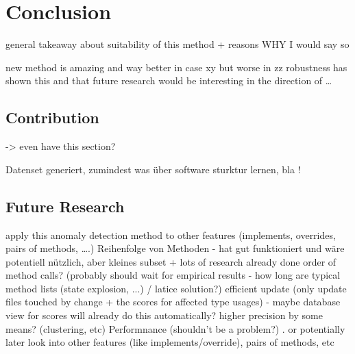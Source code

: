 \chapter{Conclusion}
general takeaway about suitability of this method + reasons WHY I would say so

new method is amazing and way better in case xy but worse in zz
robustness has shown this and that
future research would be interesting in the direction of \ldots

\section{Contribution}
-> even have this section?

Datenset generiert, zumindest was über software sturktur lernen, bla !

\section{Future Research}
apply this anomaly detection method to other features (implements, overrides, pairs of methods, \ldots.)
Reihenfolge von Methoden - hat gut funktioniert und wäre potentiell nützlich, aber kleines subset + lots of research already done
order of method calls? (probably should wait for empirical results - how long are typical method lists (state explosion, ...) / latice solution?)
efficient update (only update files touched by change + the scores for affected type usages) - maybe database view for scores will already do this automatically? 
higher precision by some means? (clustering, etc)
Performnance (shouldn't be a problem?)
.
or potentially later look into other features (like implements/override), pairs of methods, etc
